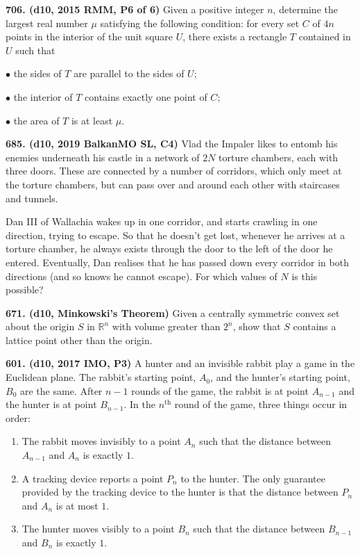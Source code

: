 \documentclass{article}
\begin{document}
\textbf{706. (\color{red}d10\color{black}, 2015 RMM, P6 of 6)} Given a positive integer $n$, determine the largest real number $\mu$ satisfying the following condition: for every set $C$ of $4n$ points in the interior of the unit square $U$, there exists a rectangle $T$ contained in $U$ such that

$\bullet$ the sides of $T$ are parallel to the sides of $U$;

$\bullet$ the interior of $T$ contains exactly one point of $C$;

$\bullet$ the area of $T$ is at least $\mu$.

\textbf{685. (\color{red}d10\color{black}, 2019 BalkanMO SL, C4)} Vlad the Impaler likes to entomb his enemies underneath his castle in a network of $2N$ torture chambers, each with three doors. These are connected by a number of corridors, which only meet at the torture chambers, but can pass over and around each other with staircases and tunnels.

Dan III of Wallachia wakes up in one corridor, and starts crawling in one direction, trying to escape. So that he doesn't get lost, whenever he arrives at a torture chamber, he always exists through the door to the left of the door he entered. Eventually, Dan realises that he has passed down every corridor in both directions (and so knows he cannot escape). For which values of $N$ is this possible?

\textbf{671. (\color{red}d10\color{black}, Minkowski's Theorem)} Given a centrally symmetric convex set about the origin $S$ in $\mathbb{R}^n$ with volume greater than $2^n$, show that $S$ contains a lattice point other than the origin.

\textbf{601. (\color{red}d10\color{black}, 2017 IMO, P3)} A hunter and an invisible rabbit play a game in the Euclidean plane. The rabbit's starting point, $A_0$, and the hunter's starting point, $B_0$ are the same. After $n-1$ rounds of the game, the rabbit is at point $A_{n-1}$ and the hunter is at point $B_{n-1}$. In the $n^{\text{th}}$ round of the game, three things occur in order:



\begin{enumerate}

        \item The rabbit moves invisibly to a point $A_n$ such that the distance between $A_{n-1}$ and $A_n$ is exactly $1$.



        \item A tracking device reports a point $P_n$ to the hunter. The only guarantee provided by the tracking device to the hunter is that the distance between $P_n$ and $A_n$ is at most $1$.



        \item The hunter moves visibly to a point $B_n$ such that the distance between $B_{n-1}$ and $B_n$ is exactly $1$.

\end{enumerate}
\end{document}
